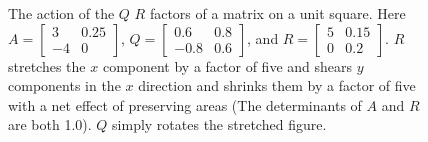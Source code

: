 \begin{figure}[htbp]
  \caption[The action of the $Q$ $R$ factors of a matrix on a unit square.]%
  {The action of the $Q$ $R$ factors of a matrix on a unit square.
    Here $A=
    \begin{bmatrix} 3 & 0.25 \\ -4 & 0 \end{bmatrix}$, $Q=
    \begin{bmatrix} 0.6 & 0.8 \\ -0.8 & 0.6 \end{bmatrix}$, and $R=
    \begin{bmatrix} 5 & 0.15 \\ 0 & 0.2 \end{bmatrix}$.  $R$ stretches the
    $x$ component by a factor of five and shears $y$ components in the
    $x$ direction and shrinks them by a factor of five with a net
    effect of preserving areas (The determinants of
    $A$ and $R$ are both 1.0).  $Q$ simply rotates the stretched figure.}
  \label{fig:QR}
\end{figure}
